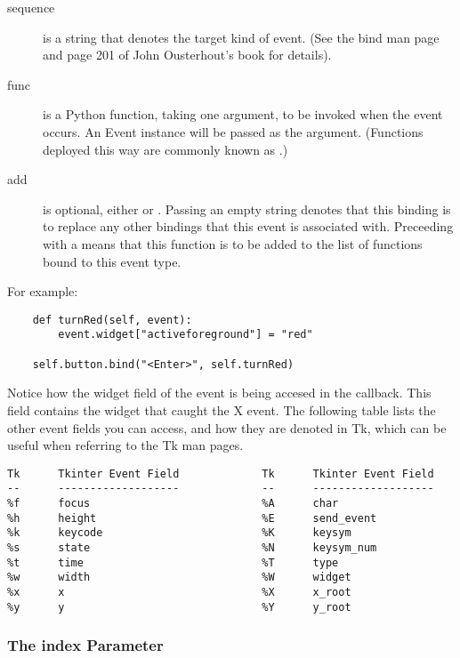 \begin{description}
\item[sequence]
is a string that denotes the target kind of event.  (See the bind
man page and page 201 of John Ousterhout's book for details).

\item[func]
is a Python function, taking one argument, to be invoked when the
event occurs.  An Event instance will be passed as the argument.
(Functions deployed this way are commonly known as .)

\item[add]
is optional, either \samp{} or \samp{+}.  Passing an empty string
denotes that this binding is to replace any other bindings that this
event is associated with.  Preceeding with a \samp{+} means that this
function is to be added to the list of functions bound to this event type.
\end{description}

For example:
\begin{verbatim}
    def turnRed(self, event):
        event.widget["activeforeground"] = "red"

    self.button.bind("<Enter>", self.turnRed)
\end{verbatim}

Notice how the widget field of the event is being accesed in the
 callback.  This field contains the widget that
caught the X event.  The following table lists the other event fields
you can access, and how they are denoted in Tk, which can be useful
when referring to the Tk man pages.

\begin{verbatim}
Tk      Tkinter Event Field             Tk      Tkinter Event Field 
--      -------------------             --      -------------------
%f      focus                           %A      char
%h      height                          %E      send_event
%k      keycode                         %K      keysym
%s      state                           %N      keysym_num
%t      time                            %T      type
%w      width                           %W      widget
%x      x                               %X      x_root
%y      y                               %Y      y_root
\end{verbatim}


\subsubsection{The index Parameter} %

